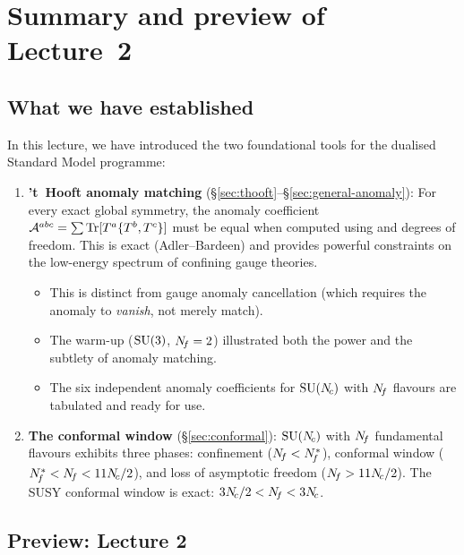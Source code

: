 \documentclass[11pt,a4paper]{article}
\begin{document}
\section{Summary and preview of Lecture~2}
\label{sec:summary}

\subsection{What we have established}

In this lecture, we have introduced the two foundational tools for the
dualised Standard Model programme:

\begin{enumerate}
  \item \textbf{'t~Hooft anomaly matching} (\S\ref{sec:thooft}--\S\ref{sec:general-anomaly}):
    For every exact global symmetry, the anomaly coefficient
    $\mathcal{A}^{abc} = \sum \mathrm{Tr}[T^a\{T^b,T^c\}]$ must be equal when
    computed using \UV{} and \IR{} degrees of freedom.  This is exact
    (Adler--Bardeen) and provides powerful constraints on the
    low-energy spectrum of confining gauge theories.
    \begin{itemize}
      \item This is distinct from gauge anomaly cancellation (which requires
        the anomaly to \emph{vanish}, not merely match).
      \item The warm-up ($\mathrm{SU}(3)$, $N_{\!f} = 2$) illustrated both the
        power and the subtlety of anomaly matching.
      \item The six independent anomaly coefficients for $\mathrm{SU}(N_{\!c})$ with
        $N_{\!f}$ flavours are tabulated and ready for use.
    \end{itemize}

  \item \textbf{The conformal window} (\S\ref{sec:conformal}):
    $\mathrm{SU}(N_{\!c})$ with $N_{\!f}$ fundamental flavours exhibits three phases:
    confinement ($N_{\!f} < N_{\!f}^*$), conformal window
    ($N_{\!f}^* < N_{\!f} < 11N_{\!c}/2$), and loss of asymptotic freedom
    ($N_{\!f} > 11N_{\!c}/2$).  The SUSY conformal window is exact:
    $3N_{\!c}/2 < N_{\!f} < 3N_{\!c}$.
\end{enumerate}

\subsection{Preview: Lecture 2}
\end{document}
